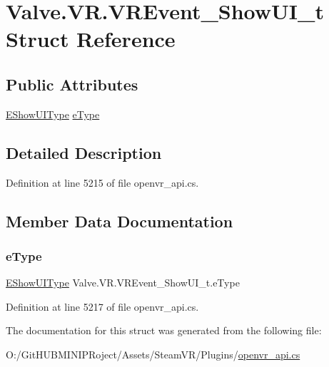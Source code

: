 \hypertarget{struct_valve_1_1_v_r_1_1_v_r_event___show_u_i__t}{}\section{Valve.\+V\+R.\+V\+R\+Event\+\_\+\+Show\+U\+I\+\_\+t Struct Reference}
\label{struct_valve_1_1_v_r_1_1_v_r_event___show_u_i__t}
\subsection*{Public Attributes}
\begin{DoxyCompactItemize}
\item 
\mbox{\hyperlink{namespace_valve_1_1_v_r_a0569f001d98365a6a8891a651f7157fe}{E\+Show\+U\+I\+Type}} \mbox{\hyperlink{struct_valve_1_1_v_r_1_1_v_r_event___show_u_i__t_a4a1940248218f33525fda430a0f3365b}{e\+Type}}
\end{DoxyCompactItemize}


\subsection{Detailed Description}


Definition at line 5215 of file openvr\+\_\+api.\+cs.



\subsection{Member Data Documentation}
\mbox{\label{struct_valve_1_1_v_r_1_1_v_r_event___show_u_i__t_a4a1940248218f33525fda430a0f3365b}} 
\subsubsection{\texorpdfstring{eType}{eType}}
{\footnotesize\ttfamily \mbox{\hyperlink{namespace_valve_1_1_v_r_a0569f001d98365a6a8891a651f7157fe}{E\+Show\+U\+I\+Type}} Valve.\+V\+R.\+V\+R\+Event\+\_\+\+Show\+U\+I\+\_\+t.\+e\+Type}



Definition at line 5217 of file openvr\+\_\+api.\+cs.



The documentation for this struct was generated from the following file\+:\begin{DoxyCompactItemize}
\item 
O\+:/\+Git\+H\+U\+B\+M\+I\+N\+I\+P\+Roject/\+Assets/\+Steam\+V\+R/\+Plugins/\mbox{\hyperlink{openvr__api_8cs}{openvr\+\_\+api.\+cs}}\end{DoxyCompactItemize}
